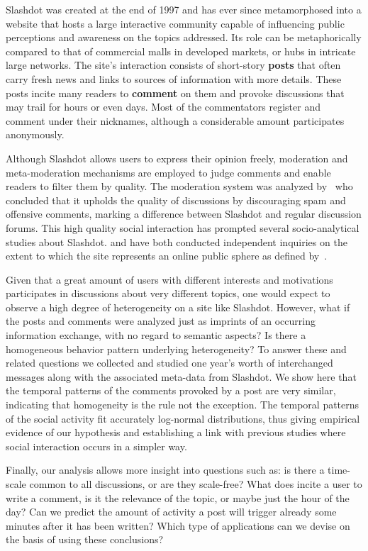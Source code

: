 \documentclass[twoside,11pt]{article}
\begin{document}
Slashdot was created at the end of 1997 and has ever since
metamorphosed into a website that hosts a large interactive community
capable of influencing public perceptions and awareness on the topics
addressed.  Its role can be metaphorically compared to that of
commercial malls in developed markets, or hubs in intricate large
networks.  The site's interaction consists of short-story
\textbf{posts} that often carry fresh news and links to sources of
information with more details. These posts incite many readers to
\textbf{comment} on them and provoke discussions that may trail for
hours or even days. Most of the commentators register and comment
under their nicknames, although a considerable amount participates
anonymously.

Although Slashdot allows users to express their opinion freely,
moderation and me\-ta-mod\-er\-a\-tion mechanisms are employed to
judge comments and enable readers to filter them by quality.  The
moderation system was analyzed by~\citet{Lampe04}
who concluded that it upholds the quality of discussions by
discouraging spam and offensive comments, marking a difference between
Slashdot and regular discussion forums.  This high quality social
interaction has prompted several socio-analytical studies about
Slashdot. \citet{Poor05} and \citet{Baoill00} have
both conducted independent inquiries on the extent to which the site
represents an online public sphere as defined by~\citet{Habermas89}.

Given that a great amount of users with different interests and
motivations participates in discussions about very different topics,
one would expect to observe a high degree of heterogeneity on a site
like Slashdot.  However, what if the posts and comments were analyzed
just as imprints of an occurring information exchange, with no regard
to semantic aspects?  Is there a homogeneous behavior pattern
underlying heterogeneity?  To answer these and related questions we
collected and studied one year's worth of interchanged messages along
with the associated meta-data from Slashdot.  We show here that the
temporal patterns of the comments provoked by a post are very similar,
indicating that homogeneity is the rule not the exception.  The
temporal patterns of the social activity fit accurately log-normal
distributions, thus giving empirical evidence of our hypothesis and
establishing a link with previous studies where social interaction
occurs in a simpler way.

Finally, our analysis allows more insight into questions such as: is
there a time-scale common to all discussions, or are they scale-free?
What does incite a user to write a comment, is it the relevance of the
topic, or maybe just the hour of the day?  Can we predict the amount
of activity a post will trigger already some minutes after it has been
written?  Which type of applications can we devise on the basis of
using these conclusions?
\end{document}

